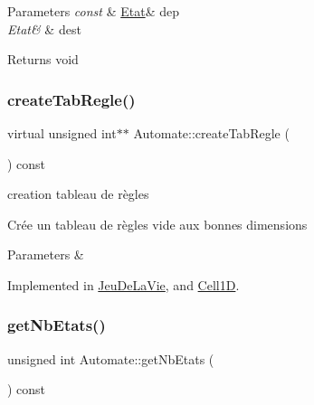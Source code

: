 \begin{DoxyParams}{Parameters}
{\em const} & \mbox{\hyperlink{class_etat}{Etat}}\& dep \\
\hline
{\em Etat\&} & dest \\
\hline
\end{DoxyParams}
\begin{DoxyReturn}{Returns}
void 
\end{DoxyReturn}
\mbox{\label{class_automate_a5c625d4aea9454fb83f305f59e964884}} 
\subsubsection{\texorpdfstring{create\+Tab\+Regle()}{createTabRegle()}}
{\footnotesize\ttfamily virtual unsigned int$\ast$$\ast$ Automate\+::create\+Tab\+Regle (\begin{DoxyParamCaption}{ }\end{DoxyParamCaption}) const\hspace{0.3cm}{\ttfamily [pure virtual]}}



creation tableau de règles 

Crée un tableau de règles vide aux bonnes dimensions


\begin{DoxyParams}{Parameters}
{\em } & \\
\hline
\end{DoxyParams}


Implemented in \mbox{\hyperlink{class_jeu_de_la_vie_a8e39a4d09ea17330ac86f0500ed7380e}{Jeu\+De\+La\+Vie}}, and \mbox{\hyperlink{class_cell1_d_aa19cf29a243066c0883c1c984ee55afe}{Cell1D}}.

\mbox{\label{class_automate_a99fb6a12fdbf9a678b5ae894ff88e235}} 
\subsubsection{\texorpdfstring{get\+Nb\+Etats()}{getNbEtats()}}
{\footnotesize\ttfamily unsigned int Automate\+::get\+Nb\+Etats (\begin{DoxyParamCaption}{ }\end{DoxyParamCaption}) const\hspace{0.3cm}{\ttfamily [inline]}}




